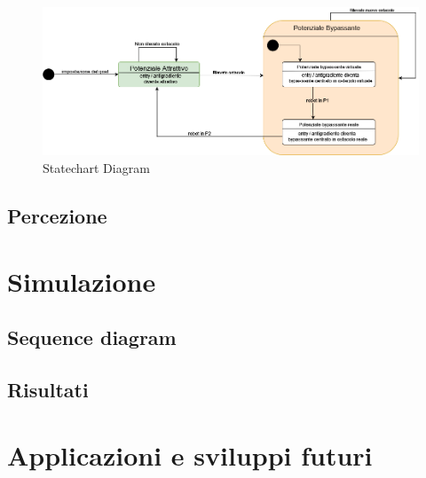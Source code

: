 \documentclass[14pt,a4paper]{extarticle}
\begin{document}
\begin{figure}[H]
\caption{Statechart Diagram} \label{state}
\includegraphics[width=\textwidth]{statechart.png}
\end{figure}


	

\subsection{Percezione}

\section{Simulazione}

\subsection{Sequence diagram}

\subsection{Risultati}

\section{Applicazioni e sviluppi futuri}

\newpage

\begin{adjustbox}{width=\textwidth , bgcolor=backcolour}

\end{adjustbox}

\listoffigures
\lstlistoflistings

\newpage

\printbibliography
\end{document}
